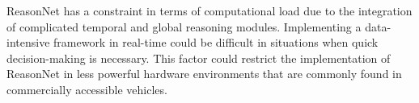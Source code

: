ReasonNet has a constraint in terms of computational load due to the integration of complicated temporal and global reasoning modules. Implementing a data-intensive framework in real-time could be difficult in situations when quick decision-making is necessary. This factor could restrict the implementation of ReasonNet in less powerful hardware environments that are commonly found in commercially accessible vehicles.
